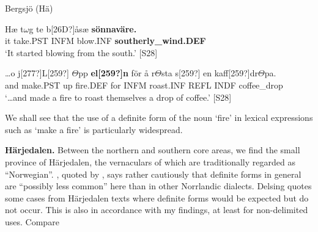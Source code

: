 \item 

\label{bkm:Ref154221800}Bergsjö (Hä)



\item 


 \ea\label{}
\gll Hæ  t$\omega $g  te  b[26D?]åsæ  \textbf{sönnaväre.}\\


it  take.PST  INFM  blow.INF  \textbf{southerly\_wind.DEF}\\

\glt ‘It started blowing from the south.’ [S28]

\z

\item 


 \ea\label{}
\gll …o  j[277?]L[259?]  $\Theta $pp  \textbf{el[259?]n} för  å  r$\Theta $sta  s[259?]  en  kaff[259?]dr$\Theta $pa.\\


and  make.PST  up  fire.DEF  for  INFM  roast.INF  REFL  INDF  coffee\_drop\\

\glt ‘…and made a fire to roast themselves a drop of coffee.’ [S28]

\z

We shall see that the use of a definite form of the noun ‘fire’ in lexical expressions such as ‘make a fire’ is particularly widespread.


\textbf{Härjedalen.} Between the northern and southern core areas, we find the small province of Härjedalen, the vernaculars of which are traditionally regarded as “Norwegian”. \citet[28]{Reinhammar1973}, quoted by \citet[19]{Delsing2003a}, says rather cautiously that definite forms in general are “possibly less common” here than in other Norrlandic dialects. Delsing quotes some cases from Härjedalen texts where definite forms would be expected but do not occur. This is also in accordance with my findings, at least for non-delimited uses. Compare

